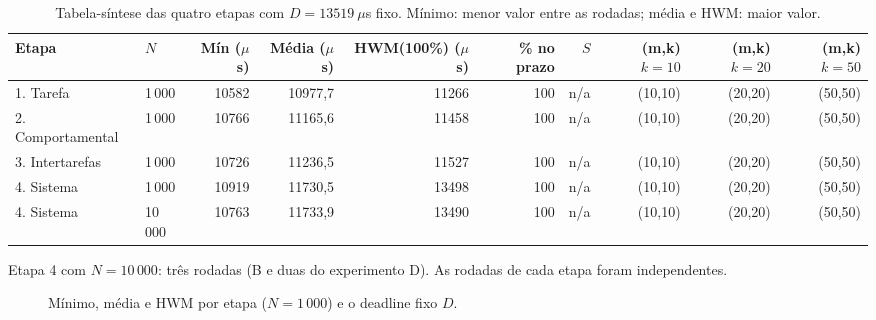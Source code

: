 \documentclass[conference,a4paper]{IEEEtran}
\begin{document}
\begin{table}[!t]
\centering
\caption{Tabela-síntese das quatro etapas com $D = 13519\ \mu$s fixo. Mínimo: menor valor entre as rodadas; média e HWM: maior valor.}
\small
\setlength{\tabcolsep}{4pt}
\begin{tabular}{llrrrrrrrr}
\toprule
Etapa & $N$ & Mín ($\mu$s) & Média ($\mu$s) & HWM(100\%) ($\mu$s) & \% no prazo & $S$ & (m,k) $k{=}10$ & (m,k) $k{=}20$ & (m,k) $k{=}50$ \\
\midrule
1. Tarefa & 1\,000 & 10582 & 10977,7 & 11266 & 100 & n/a & (10,10) & (20,20) & (50,50) \\
2. Comportamental & 1\,000 & 10766 & 11165,6 & 11458 & 100 & n/a & (10,10) & (20,20) & (50,50) \\
3. Intertarefas & 1\,000 & 10726 & 11236,5 & 11527 & 100 & n/a & (10,10) & (20,20) & (50,50) \\
4. Sistema & 1\,000 & 10919 & 11730,5 & 13498 & 100 & n/a & (10,10) & (20,20) & (50,50) \\
4. Sistema & 10\,000 & 10763 & 11733,9 & 13490 & 100 & n/a & (10,10) & (20,20) & (50,50) \\
\bottomrule
\end{tabular}
\par\smallskip\begin{minipage}{\textwidth}\footnotesize Etapa 4 com $N = 10\,000$: três rodadas (B e duas do experimento D). As rodadas de cada etapa foram independentes.
\end{minipage}
\end{table}

\begin{figure}[!t]
\centering
{}
\caption{Mínimo, média e HWM por etapa ($N = 1\,000$) e o deadline fixo $D$.}
\end{figure}
\end{document}
